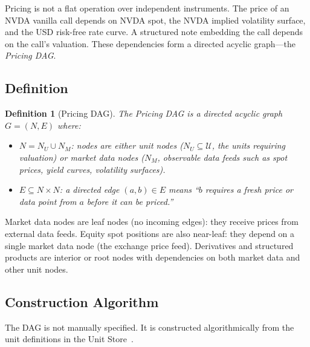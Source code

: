 \documentclass[11pt,a4paper]{article}
\newtheorem{definition}{Definition}[section]
\begin{document}
Pricing is not a flat operation over independent instruments.  The price of an NVDA vanilla call depends on NVDA spot, the NVDA implied volatility surface, and the USD risk-free rate curve.  A structured note embedding the call depends on the call's valuation.  These dependencies form a directed acyclic graph---the \emph{Pricing DAG}.

\subsection{Definition}

\begin{definition}[Pricing DAG]
\label{def:pricing-dag}
The \emph{Pricing DAG} is a directed acyclic graph $G = (N, E)$ where:
\begin{itemize}[nosep]
\item $N = N_U \cup N_M$: nodes are either unit nodes ($N_U \subseteq \mathcal{U}$, the units requiring valuation) or market data nodes ($N_M$, observable data feeds such as spot prices, yield curves, volatility surfaces).
\item $E \subseteq N \times N$: a directed edge $(a, b) \in E$ means ``$b$ requires a fresh price or data point from $a$ before it can be priced.''
\end{itemize}
\end{definition}

\noindent Market data nodes are leaf nodes (no incoming edges): they receive prices from external data feeds.  Equity spot positions are also near-leaf: they depend on a single market data node (the exchange price feed).  Derivatives and structured products are interior or root nodes with dependencies on both market data and other unit nodes.

\subsection{Construction Algorithm}
\label{sec:dag-construction}

The DAG is not manually specified.  It is constructed algorithmically from the unit definitions in the Unit Store~\cite[\S3]{ledger}.
\end{document}
